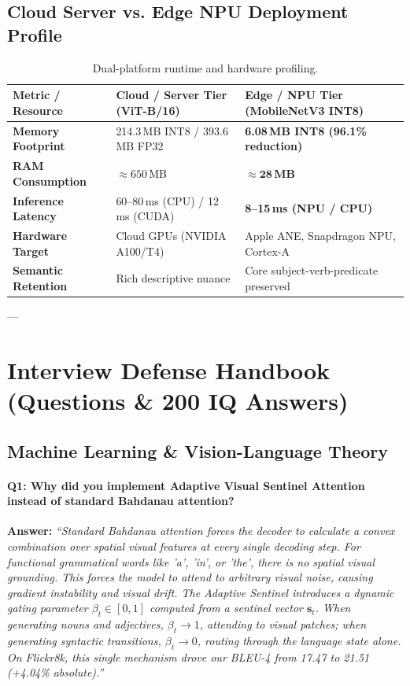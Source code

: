 \documentclass[11pt,a4paper]{article}
\begin{document}
\subsection{Cloud Server vs. Edge NPU Deployment Profile}
\begin{table}[h]
\centering
\small
\begin{tabularx}{\textwidth}{p{4cm} p{5.5cm} p{5.5cm}}
\toprule
\textbf{Metric / Resource} & \textbf{Cloud / Server Tier (ViT-B/16)} & \textbf{Edge / NPU Tier (MobileNetV3 INT8)} \\
\midrule
\textbf{Memory Footprint} & 214.3\,MB INT8 / 393.6\,MB FP32 & \textbf{6.08\,MB INT8 (96.1\% reduction)} \\
\textbf{RAM Consumption} & $\approx 650$\,MB & $\approx \mathbf{28\,MB}$ \\
\textbf{Inference Latency} & 60--80\,ms (CPU) / 12\,ms (CUDA) & \textbf{8--15\,ms (NPU / CPU)} \\
\textbf{Hardware Target} & Cloud GPUs (NVIDIA A100/T4) & Apple ANE, Snapdragon NPU, Cortex-A \\
\textbf{Semantic Retention} & Rich descriptive nuance & Core subject-verb-predicate preserved \\
\bottomrule
\end{tabularx}
\caption{Dual-platform runtime and hardware profiling.}
\end{table}

---

\section{Interview Defense Handbook (Questions \& 200 IQ Answers)}

\subsection{Machine Learning \& Vision-Language Theory}

\paragraph{Q1: Why did you implement Adaptive Visual Sentinel Attention instead of standard Bahdanau attention?}
\textbf{Answer:} 
\textit{``Standard Bahdanau attention forces the decoder to calculate a convex combination over spatial visual features at every single decoding step. For functional grammatical words like 'a', 'in', or 'the', there is no spatial visual grounding. This forces the model to attend to arbitrary visual noise, causing gradient instability and visual drift. The Adaptive Sentinel introduces a dynamic gating parameter $\beta_t \in [0, 1]$ computed from a sentinel vector $\mathbf{s}_t$. When generating nouns and adjectives, $\beta_t \to 1$, attending to visual patches; when generating syntactic transitions, $\beta_t \to 0$, routing through the language state alone. On Flickr8k, this single mechanism drove our BLEU-4 from 17.47 to 21.51 (+4.04\% absolute).''}
\end{document}
